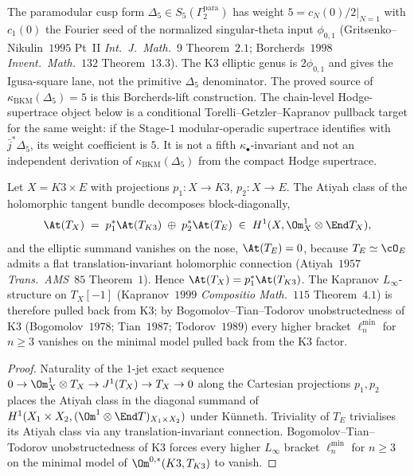 \providecommand{\aHodgeBKM}{a_{\mathrm{Hodge}\to\mathrm{BKM}}}
\providecommand{\Mbar}{\overline{\mathcal M}}

The paramodular cusp form $\Delta_5 \in S_5(\Gamma_2^{\mathrm{para}})$ has weight $5 = \left.c_N(0)/2\right|_{N=1}$ with $c_1(0)$ the Fourier seed of the normalized singular-theta input $\phi_{0,1}$ (Gritsenko--Nikulin~$1995$ Pt~II \emph{Int.\ J.\ Math.}~9 Theorem~$2.1$; Borcherds~$1998$ \emph{Invent.~Math.}~$132$ Theorem~$13.3$). The K3 elliptic genus is \(2\phi_{0,1}\) and gives the Igusa-square lane, not the primitive \(\Delta_5\) denominator. The proved source of $\kappa_{\mathrm{BKM}}(\Delta_5) = 5$ is this Borcherds-lift construction. The chain-level Hodge-supertrace object below is a conditional Torelli--Getzler--Kapranov pullback target for the same weight: if the Stage-$1$ modular-operadic supertrace identifies with $\bar j^*\Delta_5$, its weight coefficient is $5$. It is not a fifth $\kappa_\bullet$-invariant and not an independent derivation of $\kappa_{\mathrm{BKM}}(\Delta_5)$ from the compact Hodge supertrace.

\begin{theorem}
\label{prop:bl-atiyah-block-diagonal-k3e}
Let $X = K3 \times E$ with projections $p_1 \colon X \to K3$, $p_2 \colon X \to E$. The Atiyah class of the holomorphic tangent bundle decomposes block-diagonally,
\[
 \At(T_X) \;=\; p_1^* \At(T_{K3}) \;\oplus\; p_2^* \At(T_E)
 \;\in\; H^1(X, \Om^1_X \otimes \End T_X),
\]
and the elliptic summand vanishes on the nose, $\At(T_E) = 0$, because $T_E \simeq \cO_E$ admits a flat translation-invariant holomorphic connection (Atiyah~$1957$ \emph{Trans.~AMS}~$85$ Theorem~$1$). Hence $\At(T_X) = p_1^* \At(T_{K3})$. The Kapranov $L_\infty$-structure on $T_X[-1]$ (Kapranov~$1999$ \emph{Compositio Math.}~$115$ Theorem~$4.1$) is therefore pulled back from K3; by Bogomolov--Tian--Todorov unobstructedness of K3 (Bogomolov~$1978$; Tian~$1987$; Todorov~$1989$) every higher bracket $\ell_n^{\min}$ for $n \geq 3$ vanishes on the minimal model pulled back from the K3 factor.
\end{theorem}

\begin{proof}
Naturality of the $1$-jet exact sequence $0 \to \Om^1_X \otimes T_X \to J^1(T_X) \to T_X \to 0$ along the Cartesian projections $p_1, p_2$ places the Atiyah class in the diagonal summand of $H^1(X_1 \times X_2, (\Om^1 \otimes \End T)_{X_1 \times X_2})$ under K\"unneth. Triviality of $T_E$ trivialises its Atiyah class via any translation-invariant connection. Bogomolov--Tian--Todorov unobstructedness of K3 forces every higher $L_\infty$ bracket $\ell_n^{\min}$ for $n \geq 3$ on the minimal model of $\Om^{0, *}(K3, T_{K3})$ to vanish.
\end{proof}

